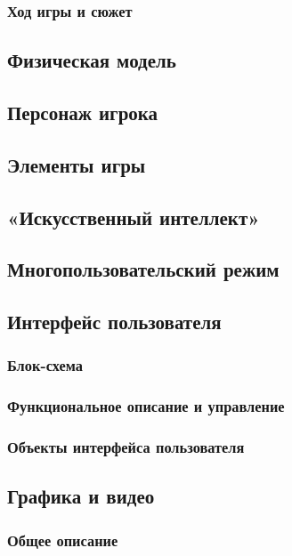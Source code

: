 \documentclass{article}
\begin{document}
\subsubsection{Ход игры и сюжет}

\subsection{Физическая модель}

\subsection{Персонаж игрока}

\subsection{Элементы игры}

\subsection{«Искусственный интеллект»}

\subsection{Многопользовательский режим}


\subsection{Интерфейс пользователя}
\subsubsection{Блок-схема}


\subsubsection{Функциональное описание и управление}


\subsubsection{Объекты интерфейса пользователя}


\subsection{Графика и видео}
\subsubsection{Общее описание}
\end{document}

